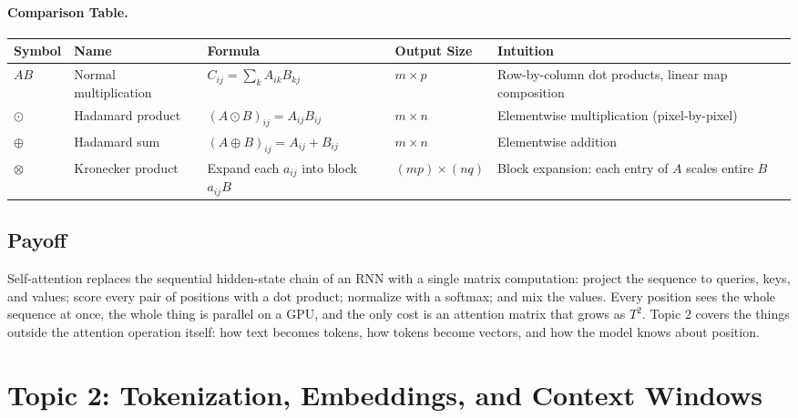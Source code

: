 \documentclass[11pt]{article}
\theoremstyle{remark}
\begin{document}
\paragraph{Comparison Table.}
\begin{center}
\renewcommand{\arraystretch}{1.5}
\begin{tabular}{>{\centering\arraybackslash}m{1.4cm} >{\centering\arraybackslash}m{2.4cm} >{\centering\arraybackslash}m{3.6cm} >{\centering\arraybackslash}m{2.2cm} >{\arraybackslash}m{4.0cm}}
\toprule
\textbf{Symbol} & \textbf{Name} & \textbf{Formula} & \textbf{Output Size} & \textbf{Intuition} \\
\midrule
\(AB\) & Normal multiplication & \(C_{ij} = \sum_k A_{ik}B_{kj}\) & \(m \times p\) & Row-by-column dot products, linear map composition \\
\midrule
\(\odot\) & Hadamard product & \((A \odot B)_{ij} = A_{ij}B_{ij}\) & \(m \times n\) & Elementwise multiplication (pixel-by-pixel) \\
\midrule
\(\oplus\) & Hadamard sum & \((A \oplus B)_{ij} = A_{ij} + B_{ij}\) & \(m \times n\) & Elementwise addition \\
\midrule
\(\otimes\) & Kronecker product & Expand each \(a_{ij}\) into block \(a_{ij}B\) & \((mp) \times (nq)\) & Block expansion: each entry of \(A\) scales entire \(B\) \\
\bottomrule
\end{tabular}
\end{center}

\subsection{Payoff}

Self-attention replaces the sequential hidden-state chain of an RNN with a single matrix computation: project the sequence to queries, keys, and values; score every pair of positions with a dot product; normalize with a softmax; and mix the values. Every position sees the whole sequence at once, the whole thing is parallel on a GPU, and the only cost is an attention matrix that grows as \(T^2\). Topic 2 covers the things outside the attention operation itself: how text becomes tokens, how tokens become vectors, and how the model knows about position.

\clearpage
%
\section{Topic 2: Tokenization, Embeddings, and Context Windows}
%
\end{document}
